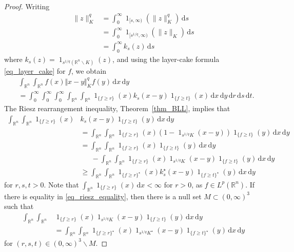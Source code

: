 \documentclass{amsart}
\newcommand{\R}{\mathbb R}
\renewcommand{\d}{\,\mathrm{d}}
\renewcommand{\chi}{\operatorname{1}}
\begin{document}
\goodbreak
\begin{proof}
    Writing 
    \begin{align}
    \|z\|_K^{q}
    &= \int_0^\infty \chi_{[s,\infty)}(\|z\|_K^q) \d s\\
    &= \int_0^\infty \chi_{[s^{1/q},\infty)}(\|z\|_K) \d s\\
    &= \int_0^\infty k_s(z) \d s
    \end{align} 
    where $k_s(z) = \chi_{s^{1/q}(\R^n\backslash K)}(z)$, and using the layer-cake formula \eqref{eq_layer_cake} for $f$,
    we obtain
    \begin{align}
	&\int_{\R^n}\int_{\R^n}{f(x) {\Vert x-y\Vert_K^q}  f(y)} \d x \d y \\
    &= \int_0^\infty \int_0^\infty\int_0^\infty \int_{\R^n}\int_{\R^n} \chi_{\{f\geq r\}}(x)  k_s(x-y) \chi_{\{f\geq t\}}(x) \d x \d y \d r \d s\d t.
	\end{align}
	The Riesz rearrangement inequality, Theorem~\ref{thm_BLL},  implies that
    \begin{align}
   \int_{\R^n}\int_{\R^n} \chi_{\{f\geq r\}}(x)  &k_s(x-y) \chi_{\{f \geq  t\}}(y) \d x \d y\\
	&= \int_{\R^n}\int_{\R^n} \chi_{\{f \geq r\}}(x) (1- \chi_{s^{1/q}K}(x-y)) \chi_{\{f \geq  t\}}(y) \d x \d y\\
	& =\int_{\R^n}\int_{\R^n} \chi_{\{f\geq  r\}}(x)\chi_{\{f\geq t\}}(y) \d x \d y 
	\\&\phantom{=\,}- \int_{\R^n}\int_{\R^n}  \chi_{\{f\geq  r\}}(x) \chi_{s^{1/q}K}(x-y) \chi_{\{f \geq  t\}}(y) \d x \d y\\
   & \ge
    \int_{\R^n}\int_{\R^n} \chi_{\{f\geq r\}^\star}(x)  k_s^\star(x-y) \chi_{\{f\geq  t\}^\star}(y) \d x \d y
    \end{align}
    for $ r, s,  t>0$. Note that $\int_{\R^n} \chi_{\{f\geq  r\}}(x) \d x <\infty$ for $r>0$, as $f\in L^p(\R^n)$. If there is equality in \eqref{eq_riesz_equality}, then there is a null set $M\subset(0,\infty)^3$ such that  
    \begin{equation}\label{eq_BLLp2}
    \begin{aligned}
    \int_{\R^n} \int_{\R^n}   &\chi_{\{f \ge r\}}(x)  \chi_{s^{ 1/q}K}(x-y) \chi_{\{f \ge  t\}}(y) \d x \d y  \\
    &=
    \int_{\R^n} \int_{\R^n}  \chi_{\{f \ge   r\}^\star}(x) \chi_{s^{ 1/q}K^\star}(x-y) \chi_{\{f\ge  t\}^\star}(y) \d x \d y
    \end{aligned}
    \end{equation}
for  $( r,s,  t)\in (0,\infty)^3\backslash M$.


\end{proof}
\end{document}
